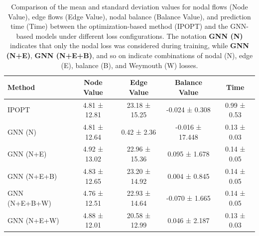 %



\begin{table}[htbp]
\centering
\begin{tabular}{|l|c|c|c|c|}
    \hline
    Method & Node Value & Edge Value & Balance Value & Time \\ \hline
    IPOPT & 4.81 ± 12.81 & 23.18 ± 15.25 & -0.024 ± 0.308 & 0.99 ± 0.53 \\ \hline
    GNN (N) & 4.81 ± 12.64 & 0.42 ± 2.36 & -0.016 ± 17.448 & 0.13 ± 0.03 \\ \hline
    GNN (N+E) & 4.92 ± 13.02 & 22.96 ± 15.36 & 0.095 ± 1.678 & 0.14 ± 0.05 \\ \hline
    GNN (N+E+B) & 4.83 ± 12.65 & 23.20 ± 14.92 & 0.004 ± 0.845 & 0.14 ± 0.05 \\ \hline
    GNN (N+E+B+W) & 4.76 ± 12.51 & 22.93 ± 14.64 & -0.070 ± 1.665 & 0.14 ± 0.05 \\ \hline
    GNN (N+E+W) & 4.88 ± 12.01 & 20.58 ± 12.99 & 0.046 ± 2.187 & 0.13 ± 0.03 \\ \hline
\end{tabular}
\caption{Comparison of the mean and standard deviation values for nodal flows (Node Value), edge flows (Edge Value), nodal balance (Balance Value), and prediction time (Time) between the optimization-based method (IPOPT) and the GNN-based models under different loss configurations. The notation \textbf{GNN (N)} indicates that only the nodal loss was considered during training, while \textbf{GNN (N+E)}, \textbf{GNN (N+E+B)}, and so on indicate combinations of nodal (N), edge (E), balance (B), and Weymouth (W) losses.}
\label{tab:base_nl_dummy_results_simplified}
\end{table}



